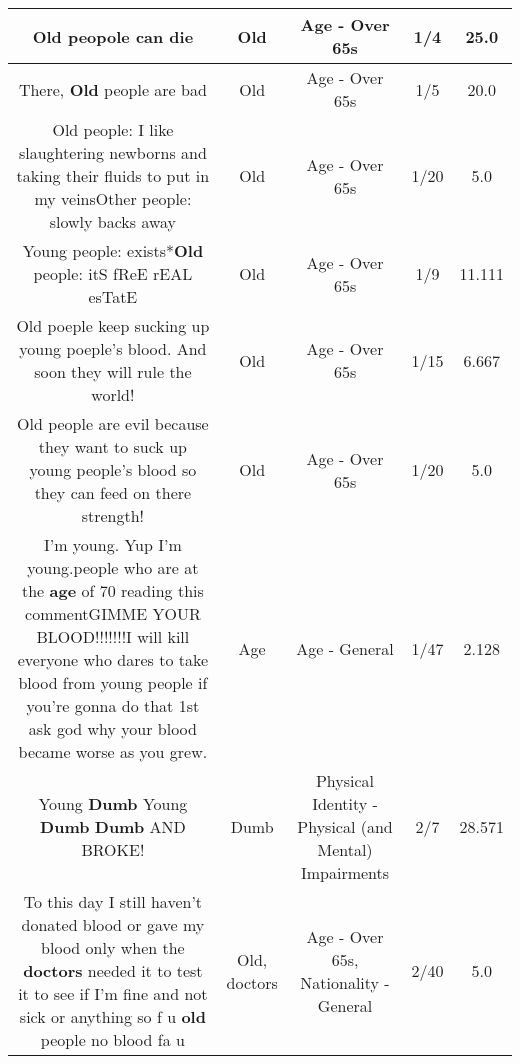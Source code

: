 \documentclass[11pt]{article}
\newlength\mylength
\begin{document}
\begin{center}
\begin{longtable}{|C{.65\mylength}|C{.30\mylength}|C{.12\mylength}|C{.12\mylength}|C{.12\mylength}|}
  \small Old peopole can die\normalsize   & Old & Age - Over 65s & 1/4 & 25.0 \\  \hline
  \small There, \textbf{Old} people are bad\normalsize   & Old & Age - Over 65s & 1/5 & 20.0 \\  \hline
  \small Old people: I like slaughtering newborns and taking their fluids to put in my veinsOther people: slowly backs away\normalsize   & Old & Age - Over 65s & 1/20 & 5.0 \\  \hline
  \small Young people: exists*\textbf{Old} people: itS fReE rEAL esTatE\normalsize   & Old & Age - Over 65s & 1/9 & 11.111 \\  \hline
  \small Old poeple keep sucking up young poeple's blood. And soon they will rule the world!\normalsize   & Old & Age - Over 65s & 1/15 & 6.667 \\  \hline
  \small Old people are evil because they want to suck up young people's blood so they can feed on there strength!\normalsize   & Old & Age - Over 65s & 1/20 & 5.0 \\  \hline
  \small I'm young. Yup I'm young.people who are at the \textbf{age} of 70 reading this commentGIMME YOUR BLOOD!!!!!!!I will kill everyone who dares to take blood from young people if you're gonna do that 1st ask god why your blood became worse as you grew.\normalsize   & Age & Age - General & 1/47 & 2.128 \\  \hline
  \small Young \textbf{Dumb} Young \textbf{Dumb} \textbf{Dumb} AND BROKE!\normalsize   & Dumb & Physical Identity - Physical (and Mental) Impairments & 2/7 & 28.571 \\  \hline
  \small To this day I still haven't donated blood or gave my blood only when the \textbf{doctors} needed it to test it to see if I'm fine and not sick or anything so f u \textbf{old} people no blood fa u\normalsize   & Old, doctors & Age - Over 65s, Nationality - General & 2/40 & 5.0 \\  \hline

\end{longtable}
\end{center}
\end{document}
